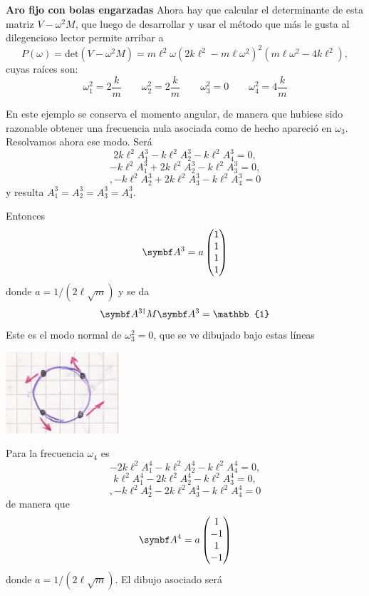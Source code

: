 \documentclass[10pt,oneside]{CBFT_book}
\begin{document}
\begin{ejemplo}{\bf Aro fijo con bolas engarzadas}
Ahora hay que calcular el determinante de esta matriz $V - \omega^2 M$, que luego de desarrollar y usar el método que más le
gusta al dilegencioso lector permite arribar a
\[
	P(\omega) = \mathrm{det}(V - \omega^2 M) = 
	m\ell^2\omega(2k\ell^2 - m\ell \omega^2)^2( m\ell\omega^2-4k\ell^2),
\]
cuyas raíces son:
\[
	\omega_1^2 = 2\frac{k}{m} \qquad 
	\omega_2^2 = 2\frac{k}{m} \qquad 
	\omega_3^2 = 0 \qquad 
	\omega_4^2 = 4\frac{k}{m}
\]

En este ejemplo se conserva el momento angular, de manera que hubiese sido razonable obtener una frecuencia nula 
asociada como de hecho apareció en $\omega_3$. Resolvamos ahora ese modo. Será
\[
	2 k \ell^2 A_1^3 - k \ell^2 A_2^3 - k \ell^2 A_4^3 = 0,
\]
\[
	- k \ell^2 A_1^3 + 2 k \ell^2 A_2^3 - k \ell^2 A_3^3 = 0,
\]
\[
,	- k \ell^2 A_2^3 + 2 k \ell^2 A_3^3 - k \ell^2 A_4^3 = 0
\]
y resulta $A_1^3 = A_2^3 = A_3^3 = A_4^3 $.

Entonces
\[
	\vb{A}^3 = a \begin{pmatrix}
	              1 \\
	              1 \\
	              1 \\
	              1 
	             \end{pmatrix} 
\]
donde $ a = 1 / ( 2 \ell \sqrt{m} ) $ y se da 
\[
	\vb{A}^{3\dagger} M \vb{A}^3 = \mathbb{1}
\]
Este es el modo normal de $\omega^2_3=0$, que se ve dibujado bajo estas líneas
 
\includegraphics[scale=0.5]{images/fig_mc_problema_aro_modos_normales_2.jpg} 

Para la frecuencia $\omega_4$ es 
\[
	- 2 k \ell^2 A_1^4 - k \ell^2 A_2^4 - k \ell^2 A_4^4 = 0,
\]
\[
	k \ell^2 A_1^4 - 2 k \ell^2 A_2^4 - k \ell^2 A_3^4 = 0,
\]
\[
,	- k \ell^2 A_2^4 - 2 k \ell^2 A_3^4 - k \ell^2 A_4^4 = 0
\]
de manera que 
\[
	\vb{A}^4 = a \begin{pmatrix}
	              1 \\
	              -1 \\
	              1 \\
	              -1 
	             \end{pmatrix} 
\]
donde $a = 1/( 2 \ell \sqrt{m})$. El dibujo asociado será


\end{ejemplo}
\end{document}
